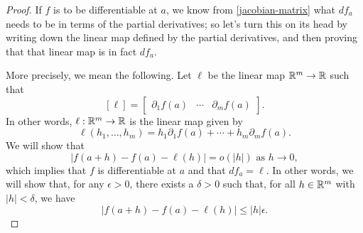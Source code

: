 \begin{proof}[Proof]
	If $f$ is to be differentiable at $a$, we know from \cref{jacobian-matrix} what $df_a$ needs to be in terms of the partial derivatives; so let's turn this on its head by writing down the linear map defined by the partial derivatives, and then proving that that linear map is in fact $df_a$. 
	
	More precisely, we mean the following. Let $\ell$ be the linear map $\mathbb{R}^m \to \mathbb{R}$ such that \[ [\ell] = \begin{bmatrix}
	\partial_1f(a) & \dotsb & \partial_m f(a)
	\end{bmatrix}. \]
	In other words, $\ell : \mathbb{R}^m \to \mathbb{R}$ is the linear map given by
	\[ \ell(h_1, \dotsc, h_m) = h_1 \partial_1 f(a) + \dotsb + h_m \partial_m f(a). \]
	We will show that 
	\[ |f(a+h) - f(a) - \ell(h)| = o(|h|) \text{ as } h \to 0, \]
	which implies that $f$ is differentiable at $a$ and that $df_a = \ell$. In other words, we will show that, for any $\epsilon > 0$, there exists a $\delta > 0$ such that, for all $h \in \mathbb{R}^m$ with $|h| < \delta$, we have
	\begin{equation} \label{continuous-differentiability-desired} |f(a+h) - f(a) - \ell(h)| \leq |h|\epsilon. \end{equation}
	

\end{proof}
